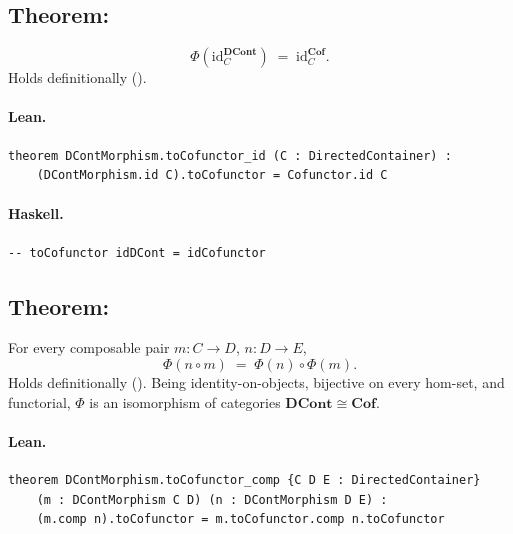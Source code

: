 \documentclass[11pt,a4paper]{article}
\begin{document}
\subsection{Theorem: }

\begin{thm}
\[
  \Phi(\mathrm{id}_C^{\mathbf{DCont}}) \;=\; \mathrm{id}_C^{\mathbf{Cof}}.
\]
Holds definitionally ().
\end{thm}

\paragraph{Lean.}
\begin{lstlisting}[style=lean]
theorem DContMorphism.toCofunctor_id (C : DirectedContainer) :
    (DContMorphism.id C).toCofunctor = Cofunctor.id C
\end{lstlisting}

\paragraph{Haskell.}
\begin{lstlisting}[style=haskell]
-- toCofunctor idDCont = idCofunctor
\end{lstlisting}


\subsection{Theorem: }

\begin{thm}
For every composable pair $m : C \to D$, $n : D \to E$,
\[
  \Phi(n \circ m) \;=\; \Phi(n) \circ \Phi(m).
\]
Holds definitionally ().  Being identity-on-objects, bijective on
every hom-set, and functorial, $\Phi$ is an isomorphism of categories
$\mathbf{DCont} \cong \mathbf{Cof}$.
\end{thm}

\paragraph{Lean.}
\begin{lstlisting}[style=lean]
theorem DContMorphism.toCofunctor_comp {C D E : DirectedContainer}
    (m : DContMorphism C D) (n : DContMorphism D E) :
    (m.comp n).toCofunctor = m.toCofunctor.comp n.toCofunctor
\end{lstlisting}
\end{document}
